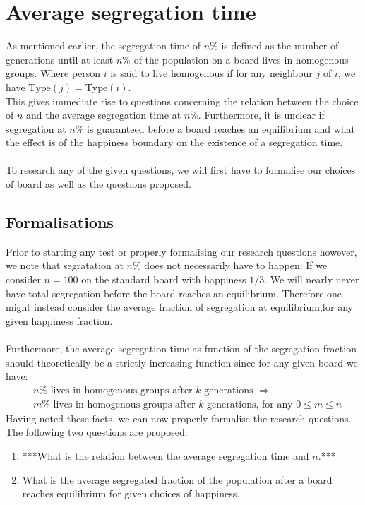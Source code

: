 \documentclass{article}
\begin{document}
\section{Average segregation time}
	As mentioned earlier, the segregation time of \(n\%\) is defined as the number of generations until at least \(n\%\) of the population on a board lives in homogenous groups. 
Where person \(i\) is said to live homogenous if for any neighbour \(j\) of \(i\), we have \(\text{Type}(j)=\text{Type}(i)\).\\
This gives immediate rise to questions concerning the relation between the choice of \(n\) and the average segregation time at \(n\%\). 
Furthermore, it is unclear if segregation at \(n\%\) is guaranteed before a board reaches an equilibrium and what the effect is of the happiness boundary on the existence of a segregation time.\\
\\
To research any of the given questions, we will first have to formalise our choices of board as well as the questions proposed.\\


\subsection{Formalisations}
Prior to starting any test or properly formalising our research questions however, we note that segratation at \(n\%\) does not necessarily have to happen: 
If we consider \(n=100\) on the standard board with happiness \(1/3\). We will nearly never have total segregation before the board reaches an equilibrium.
Therefore one might instead consider the average fraction of segregation at equilibrium,for any given happiness fraction. \\
\\
Furthermore, the average segregation time as function of the segregation fraction should theoretically be a strictly increasing function since for any given board we have:
\begin{align*}
&n\% \text{ lives in homogenous groups after } k \text{ generations } \Rightarrow\\
& m\% \text{ lives in homogenous groups after } k \text{ generations, for any } 0 \leq m \leq n
\end{align*} 
Having noted these facts, we can now properly formalise the research questions.\\
The following two questions are proposed:
\begin{enumerate}
 \item ***What is the relation between the average segregation time and \(n\).***
 \item What is the average segregated fraction of the population after a board reaches equilibrium for given choices of happiness.
\end{enumerate}
\end{document}
